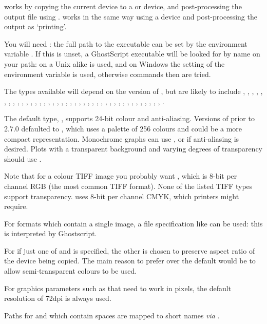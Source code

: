 \begin{Details}\relax
{} works by copying the current device to a
 or  device, and
post-processing the output file using .
 works in the same way using a  device
and post-processing the output as `printing'.

You will need : the full path to the executable can
be set by the environment variable . If this is unset, a
GhostScript executable will be looked for by name on your path: on a
Unix alike  is used, and on Windows the setting of the
environment variable  is used, otherwise commands
 then  are tried.

The types available will depend on the version of ,
but are likely to include
, , , ,
, , , ,
, , , ,
, , , ,
, , , ,
, , ,
, , , 
, , , ,
, , , ,
, , , ,
, , , .

The default type, , supports 24-bit colour and
anti-aliasing.  Versions of \R{} prior to 2.7.0 defaulted to
, which uses a palette of 256 colours and could be a
more compact representation.  Monochrome graphs can use
, or  if anti-aliasing is desired.
Plots with a transparent background and varying degrees of
transparency should use .

Note that for a colour TIFF image you probably want ,
which is 8-bit per channel RGB (the most common TIFF format).  None of
the listed TIFF types support transparency.   uses
8-bit per channel CMYK, which printers might require.

For formats which contain a single image, a file specification like
 can be used: this is interpreted by Ghostscript.

For  if just one of  and  is
specified, the other is chosen to preserve aspect ratio of the
device being copied.  The main reason to prefer 
over the default would be to allow semi-transparent colours to be used.

For graphics parameters such as  that need to work in
pixels, the default resolution of 72dpi is always used.

Paths for  and  which contain spaces are
mapped to short names \emph{via} .
\end{Details}
